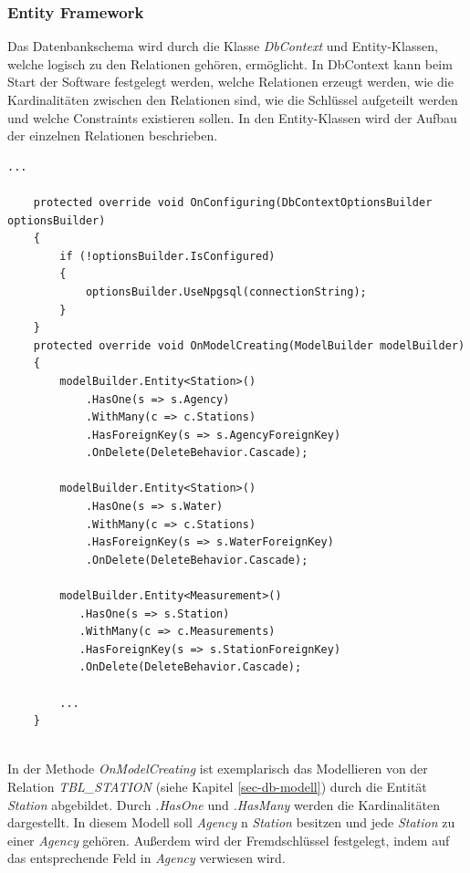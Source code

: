 \subsubsection{Entity Framework}
\label{sec-entity-framework}
Das Datenbankschema wird durch die Klasse \textit{DbContext} und Entity-Klassen, welche logisch zu den Relationen gehören, ermöglicht. In DbContext kann beim Start der Software
festgelegt werden, welche Relationen erzeugt werden, wie die Kardinalitäten zwischen den Relationen sind, wie die Schlüssel aufgeteilt werden und welche Constraints
existieren sollen. In den Entity-Klassen wird der Aufbau der einzelnen Relationen beschrieben.
~\\
\begin{lstlisting}[language={[Sharp]C}, caption={Beispiel: DbContext erstellen von einem Modell}, captionpos=b, label={Script}]
    ...

    protected override void OnConfiguring(DbContextOptionsBuilder optionsBuilder)
    {
        if (!optionsBuilder.IsConfigured)
        {
            optionsBuilder.UseNpgsql(connectionString);
        }
    }
    protected override void OnModelCreating(ModelBuilder modelBuilder)
    {
        modelBuilder.Entity<Station>()
            .HasOne(s => s.Agency)
            .WithMany(c => c.Stations)
            .HasForeignKey(s => s.AgencyForeignKey)
            .OnDelete(DeleteBehavior.Cascade);

        modelBuilder.Entity<Station>()
            .HasOne(s => s.Water)
            .WithMany(c => c.Stations)
            .HasForeignKey(s => s.WaterForeignKey)
            .OnDelete(DeleteBehavior.Cascade);

        modelBuilder.Entity<Measurement>()
           .HasOne(s => s.Station)
           .WithMany(c => c.Measurements)
           .HasForeignKey(s => s.StationForeignKey)
           .OnDelete(DeleteBehavior.Cascade);

        ...
    }
\end{lstlisting}~\\
In der Methode \textit{OnModelCreating} ist exemplarisch das Modellieren von der Relation \textit{TBL\_STATION} (siehe Kapitel \ref{sec-db-modell}) 
durch die Entität \textit{Station} abgebildet. Durch \textit{.HasOne} und \textit{.HasMany} werden die Kardinalitäten dargestellt.
In diesem Modell soll \textit{Agency} n \textit{Station} besitzen und jede \textit{Station} zu einer \textit{Agency} gehören.
Außerdem wird der Fremdschlüssel festgelegt, indem auf das entsprechende Feld in \textit{Agency} verwiesen wird.
